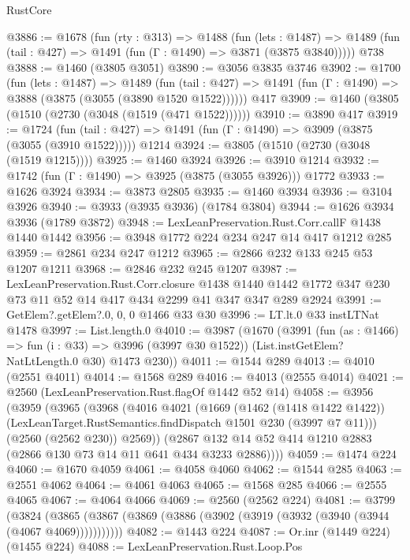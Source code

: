 \begin{lexlean}{RustCore}
\begin{coremodule}
@3886 := @1678
    (fun (rty : @313) =>
    @1488
      (fun (lets : @1487) =>
      @1489 (fun (tail : @427) => @1491 (fun (Γ : @1490) => @3871 (@3875 @3840)))))
    @738
@3888 := @1460 (@3805 @3051)
@3890 := @3056 @3835 @3746
@3902 := @1700
    (fun (lets : @1487) =>
    @1489
      (fun (tail : @427) => @1491 (fun (Γ : @1490) => @3888 (@3875 (@3055 (@3890 @1520 @1522))))))
    @417
@3909 := @1460 (@3805 (@1510 (@2730 (@3048 (@1519 (@471 @1522))))))
@3910 := @3890 @417
@3919 := @1724
    (fun (tail : @427) => @1491 (fun (Γ : @1490) => @3909 (@3875 (@3055 (@3910 @1522)))))
    @1214
@3924 := @3805 (@1510 (@2730 (@3048 (@1519 @1215))))
@3925 := @1460 @3924
@3926 := @3910 @1214
@3932 := @1742 (fun (Γ : @1490) => @3925 (@3875 (@3055 @3926))) @1772
@3933 := @1626 @3924
@3934 := @3873 @2805
@3935 := @1460 @3934
@3936 := @3104 @3926
@3940 := @3933 (@3935 @3936) (@1784 @3804)
@3944 := @1626 @3934 @3936 (@1789 @3872)
@3948 := LexLeanPreservation.Rust.Corr.callF @1438 @1440 @1442
@3956 := @3948 @1772 @224 @234 @247 @14 @417 @1212 @285
@3959 := @2861 @234 @247 @1212
@3965 := @2866 @232 @133 @245 @53 @1207 @1211
@3968 := @2846 @232 @245 @1207
@3987 := LexLeanPreservation.Rust.Corr.closure
    @1438
    @1440
    @1442
    @1772
    @347
    @230
    @73
    @11
    @52
    @14
    @417
    @434
    @2299
    @41
    @347
    @347
    @289
    @2924
@3991 := GetElem?.getElem?.{0, 0, 0} @1466 @33 @30
@3996 := LT.lt.{0} @33 instLTNat @1478
@3997 := List.length.{0}
@4010 := @3987
    (@1670
      (@3991
        (fun (as : @1466) => fun (i : @33) => @3996 (@3997 @30 @1522))
        (List.instGetElem?NatLtLength.{0} @30)
        @1473
        @230))
@4011 := @1544 @289
@4013 := @4010 (@2551 @4011)
@4014 := @1568 @289
@4016 := @4013 (@2555 @4014)
@4021 := @2560 (LexLeanPreservation.Rust.flagOf @1442 @52 @14)
@4058 := @3956
    (@3959
      (@3965
        (@3968
          (@4016
            @4021
            (@1669
              (@1462 (@1418 @1422 @1422))
              (LexLeanTarget.RustSemantics.findDispatch @1501 @230 (@3997 @7 @11)))
            (@2560 (@2562 @230))
            @2569))
        (@2867 @132 @14 @52 @414 @1210 @2883 (@2866 @130 @73 @14 @11 @641 @434 @3233 @2886))))
@4059 := @1474 @224
@4060 := @1670 @4059
@4061 := @4058 @4060
@4062 := @1544 @285
@4063 := @2551 @4062
@4064 := @4061 @4063
@4065 := @1568 @285
@4066 := @2555 @4065
@4067 := @4064 @4066
@4069 := @2560 (@2562 @224)
@4081 := @3799
    (@3824 (@3865 (@3867 (@3869 (@3886 (@3902 (@3919 (@3932 (@3940 (@3944 (@4067 @4069)))))))))))
@4082 := @1443 @224
@4087 := Or.inr (@1449 @224) (@1455 @224)
@4088 := LexLeanPreservation.Rust.Loop.Pos

\end{coremodule}
\end{lexlean}
